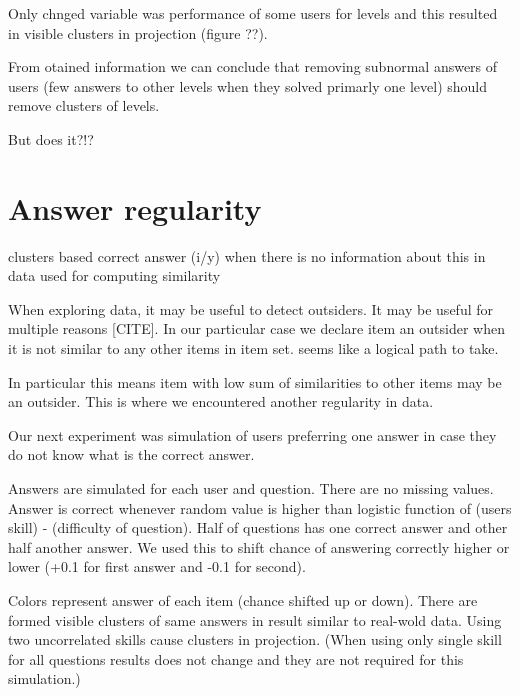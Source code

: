 \documentclass[
  digital, %
  table,   %
  nolof,     %
  nolot,     %
  nocover
]{fithesis3}
\begin{document}
Only chnged variable was performance of some users for levels and this
resulted in visible clusters in projection (figure ??).

From otained information we can conclude that removing subnormal answers
of users (few answers to other levels when they solved primarly one
level) should remove clusters of levels.

But does it?!?

\section{Answer regularity}\label{answer-regularity}

clusters based correct answer (i/y) when there is no information about
this in data used for computing similarity


When exploring data, it may be useful to detect outsiders. It may be
useful for multiple reasons [CITE]. In our particular case we
declare item an outsider when it is not similar to any other items in
item set. seems like a logical path to take.

In particular this means item with low sum of similarities to other
items may be an outsider. This is where we encountered another
regularity in data.


Our next experiment was simulation of users preferring one answer in
case they do not know what is the correct answer.

Answers are simulated for each user and question. There are no missing
values. Answer is correct whenever random value is higher than logistic
function of (users skill) - (difficulty of question). Half of questions
has one correct answer and other half another answer. We used this to
shift chance of answering correctly higher or lower (+0.1 for first
answer and -0.1 for second).


Colors represent answer of each item (chance shifted up or down). There
are formed visible clusters of same answers in result similar to
real-wold data. Using two uncorrelated skills cause clusters in
projection. (When using only single skill for all questions results does
not change and they are not required for this simulation.)
\end{document}
